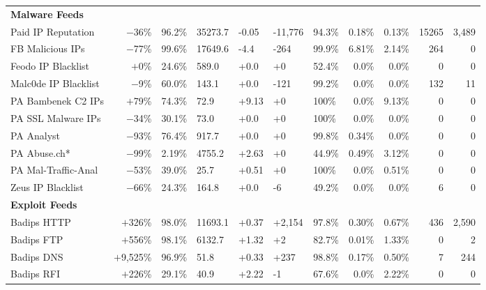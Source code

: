 \begin{table}[t!]
\begin{tabular}{l r H H H H H r r r r }
  \textbf{Malware Feeds} \\
  Paid IP Reputation 	       & $-$36\%	 & 96.2\% 	& 35273.7 	& -0.05     & -11,776   & 94.3\%& 0.18\%   & 0.13\% & 15265     & 3,489\\
  FB Malicious IPs 	           & $-$77\%   & 99.6\% 	& 17649.6   & -4.4      & -264      & 99.9\% & 6.81\%  & 2.14\% & 264     & 0   \\
  Feodo IP Blacklist 	       & $+$0\%    & 24.6\% 	& 589.0     & +0.0      & +0	    & 52.4\% & 0.0\%   & 0.0\% 	& 0      & 0 \\
  Malc0de IP Blacklist 	       & $-$9\%    & 60.0\%   & 143.1     & +0.0   	& -121      & 99.2\% & 0.0\%   & 0.0\%  & 132    & 11\\
  PA Bambenek C2 IPs 	       & $+$79\%   & 74.3\% 	& 72.9      & +9.13     & +0	    & 100\%  & 0.0\%   & 9.13\% & 0     & 0 \\
  PA SSL Malware IPs 	       & $-$34\%   & 30.1\% 	& 73.0      & +0.0      & +0	    & 100\%  & 0.0\%   & 0.0\%  & 0   & 0 \\
  PA Analyst 	               & $-$93\%    & 76.4\% 	& 917.7     & +0.0      & +0        & 99.8\% & 0.34\%  & 0.0\%  & 0  & 0\\
  PA Abuse.ch* 	               & $-$99\%   & 2.19\% 	& 4755.2    & +2.63     & +0        & 44.9\% & 0.49\%  & 3.12\% & 0  & 0\\
  PA Mal-Traffic-Anal  	       & $-$53\%   & 39.0\% 	& 25.7      & +0.51     & +0        & 100\%  & 0.0\%   & 0.51\%  & 0    & 0 \\
  Zeus IP Blacklist 	       & $-$66\%   & 24.3\%   & 164.8     & +0.0      & -6        & 49.2\% & 0.0\%   & 0.0\%   & 6  & 0\\


  \textbf{Exploit Feeds} \\

Badips HTTP    & $+$326\%    & 98.0\% 	& 11693.1 	& +0.37  & +2,154  & 97.8\%   & 0.30\%  & 0.67\%  & 436 & 2,590 \\
Badips FTP 	   & $+$556\%    & 98.1\% 	& 6132.7    & +1.32  & +2      & 82.7\%   & 0.01\%  & 1.33\%  & 0   & 2\\
Badips DNS 	   & $+$9,525\%     & 96.9\% 	& 51.8      & +0.33  & +237    & 98.8\%   & 0.17\%  & 0.50\%  & 7   & 244  \\
Badips RFI 	   & $+$226\%    & 29.1\%  & 40.9      & +2.22  & -1      & 67.6\%   & 0.0\%   & 2.22\%  & 0   & 0  \\


\end{tabular}
\end{table}

